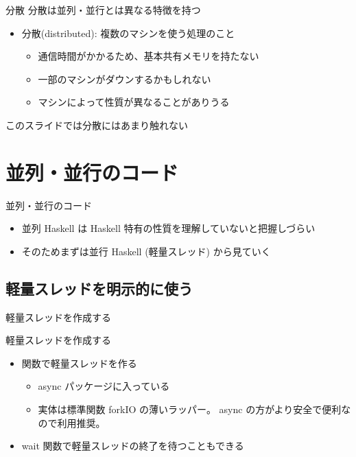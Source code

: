 \documentclass[unicode,12pt]{beamer}
\begin{document}
\begin{frame}{分散}
  分散は並列・並行とは異なる特徴を持つ
  \begin{itemize}
  \item 分散(distributed): 複数のマシンを使う処理のこと
    \begin{itemize}
    \item 通信時間がかかるため、基本共有メモリを持たない
    \item 一部のマシンがダウンするかもしれない
    \item マシンによって性質が異なることがありうる
    \end{itemize}
  \end{itemize}
  このスライドでは分散にはあまり触れない
\end{frame}

\section{並列・並行のコード}

\begin{frame}{並列・並行のコード}
  \begin{itemize}
  \item 並列 Haskell は Haskell 特有の性質を理解していないと把握しづらい
  \item そのためまずは並行 Haskell (軽量スレッド) から見ていく
  \end{itemize}
\end{frame}

\subsection{軽量スレッドを明示的に使う}

\begin{frame}{軽量スレッドを作成する}
  
\end{frame}

\begin{frame}{軽量スレッドを作成する}
  \begin{itemize}
  \item \alert{} 関数で軽量スレッドを作る
    \begin{itemize}
    \item async パッケージに入っている
    \item 実体は標準関数 {\ttfamily forkIO} の薄いラッパー。
      {\ttfamily async} の方がより安全で便利なので利用推奨。
    \end{itemize}
    \item {\ttfamily wait} 関数で軽量スレッドの終了を待つこともできる
  \end{itemize}
\end{frame}
\end{document}
